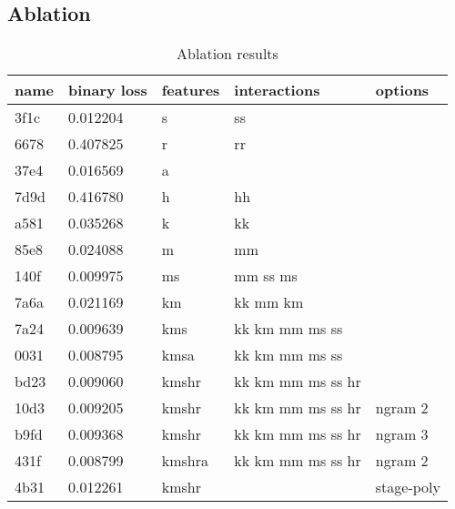 \documentclass{article}
\begin{document}


\subsection{Ablation}
%

\begin{table}[]
  \centering
  \caption{Ablation results}
  \label{ablation-results}
  \begin{tabular}{|l|l|l|l|l|}
    \hline
    name & binary loss & features & interactions & options \\ \hline
    3f1c & 0.012204 & s & ss & \\
    6678 & 0.407825 & r & rr &\\
    37e4 & 0.016569 & a & & \\
    7d9d & 0.416780 & h & hh & \\
    a581 & 0.035268 & k & kk & \\
    85e8 & 0.024088 & m & mm & \\
    140f & 0.009975 & ms & mm  ss  ms & \\
    7a6a & 0.021169 & km & kk  mm  km & \\
    7a24 & 0.009639 & kms & kk  km  mm  ms  ss & \\
    0031 & 0.008795 & kmsa & kk  km  mm  ms  ss & \\
    bd23 & 0.009060 & kmshr & kk  km  mm  ms  ss  hr & \\
    10d3 & 0.009205 & kmshr & kk  km  mm  ms  ss  hr & ngram 2 \\
    b9fd & 0.009368 & kmshr & kk  km  mm  ms  ss  hr & ngram 3 \\
    431f & 0.008799 & kmshra & kk  km  mm  ms  ss  hr & ngram 2 \\
    4b31 & 0.012261 & kmshr & & stage-poly \\
    \hline
  \end{tabular}
\end{table}
\end{document}
